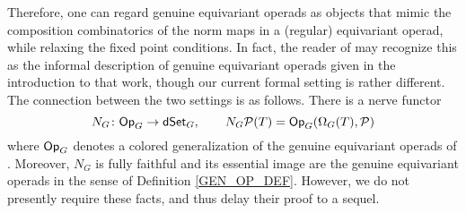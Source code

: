 \documentclass[a4paper,10pt
]{article}%
\begin{document}
\begin{remark}
Therefore, one can regard genuine equivariant operads as objects that mimic the composition combinatorics of the  norm maps in a (regular) equivariant operad, while relaxing the fixed point conditions.
In fact, the reader of \cite{BP17} may recognize this as the informal description of genuine equivariant operads given in the introduction to that work,
though our current formal setting is rather different.
The connection between the two settings is as follows.
There is a nerve functor
\begin{equation}\label{NG EQ}
N_G \colon \mathsf{Op}_G \to \mathsf{dSet}_G, \qquad N_G\mathcal{P}(T) = \mathsf{Op}_G(\Omega_G(T), \mathcal{P})
\end{equation}
where $\mathsf{Op}_G$ denotes a colored generalization of the genuine equivariant operads of \cite{BP17}. Moreover, $N_G$ is fully faithful and its essential image are the genuine equivariant operads in the sense of Definition \ref{GEN_OP_DEF}.
However, we do not presently require these facts, and thus delay their proof to a sequel.
\end{remark}




\end{document}
